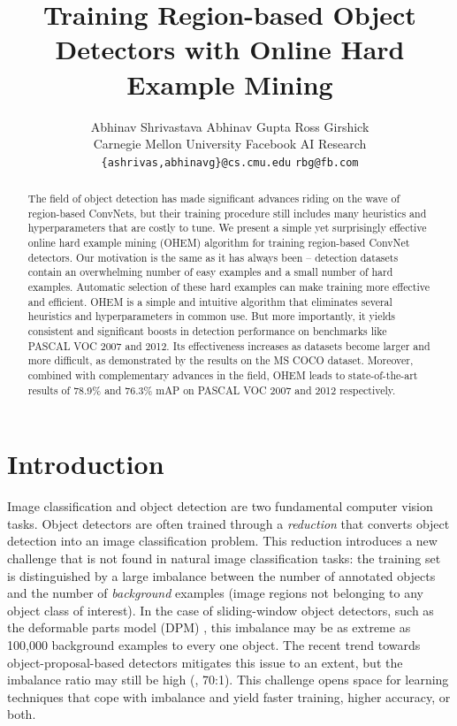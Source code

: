 \documentclass[10pt,twocolumn,letterpaper]{article}
\begin{document}
\title{Training Region-based Object Detectors with Online Hard Example Mining}
\author{
Abhinav Shrivastava \qquad
Abhinav Gupta \qquad
Ross Girshick \\
Carnegie Mellon University \qquad
Facebook AI Research\\
{\tt\small \{ashrivas,abhinavg\}@cs.cmu.edu} \qquad
{\tt\small rbg@fb.com}
}
\maketitle

\begin{abstract}
The field of object detection has made significant advances riding on the wave of region-based ConvNets, but their training procedure still includes many heuristics and hyperparameters that are costly to tune. We present a simple yet surprisingly effective online hard example mining (OHEM) algorithm for training region-based ConvNet detectors. Our motivation is the same as it has always been -- detection datasets contain an overwhelming number of easy examples and a small number of hard examples. Automatic selection of these hard examples can make training more effective and efficient. OHEM is a simple and intuitive algorithm that eliminates several heuristics and hyperparameters in common use. But more importantly, it yields consistent and significant boosts in detection performance on benchmarks like PASCAL VOC 2007 and 2012. Its effectiveness increases as datasets become larger and more difficult, as demonstrated by the results on the MS COCO dataset. Moreover, combined with complementary advances in the field, OHEM leads to state-of-the-art results of 78.9\% and 76.3\% mAP on PASCAL VOC 2007 and 2012 respectively.
\end{abstract}

\vspace{-0.15in}

\section{Introduction}\label{sec:intro}
Image classification and object detection are two fundamental computer vision tasks.
Object detectors are often trained through a \emph{reduction} that converts object detection into an image classification problem. This reduction introduces a new challenge that is not found in natural image classification tasks: the training set is distinguished by a large imbalance between the number of annotated objects and the number of \emph{background} examples (image regions not belonging to any object class of interest). In the case of sliding-window object detectors, such as the deformable parts model (DPM) \cite{dpm}, this imbalance may be as extreme as 100,000 background examples to every one object. The recent trend towards object-proposal-based detectors \cite{Uijlings13,rcnn} mitigates this issue to an extent, but the imbalance ratio may still be high (\eg, 70:1). This challenge opens space for learning techniques that cope with imbalance and yield faster training, higher accuracy, or both.
\end{document}
